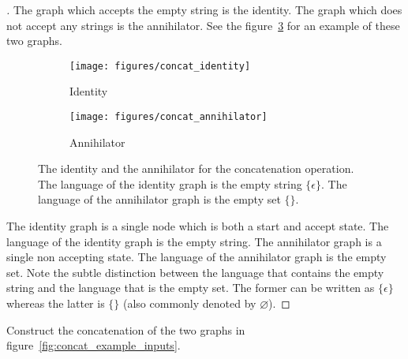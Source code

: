 \documentclass[main.tex]{subfiles}
\begin{document}
\begin{proof}[\unskip\nopunct]
The graph which accepts the empty string is the identity. The graph which does
not accept any strings is the annihilator. See the
figure~\ref{fig:concat_identity_annihilator} for an example of these two
graphs.

\begin{figure}
    \centering
    \begin{subfigure}[b]{0.48\textwidth}
        \centering
        \texttt{[image: figures/concat\_identity]}
        \caption{Identity}
        \label{fig:concat_identity}
    \end{subfigure}
    \begin{subfigure}[b]{0.48\textwidth}
        \centering
        \texttt{[image: figures/concat\_annihilator]}
        \caption{Annihilator}
        \label{fig:concat_annihilator}
    \end{subfigure}
    \caption{The identity and the annihilator for the concatenation operation.
    The language of the identity graph is the empty string $\{\epsilon\}$. The
    language of the annihilator graph is the empty set $\{\}$.}
    \label{fig:concat_identity_annihilator}
\end{figure}

The identity graph is a single node which is both a start and accept state. The
language of the identity graph is the empty string. The annihilator graph is a
single non accepting state. The language of the annihilator graph is the empty
set. Note the subtle distinction between the language that contains the empty
string and the language that is the empty set. The former can be written as
$\{\epsilon\}$ whereas the latter is $\{\}$ (also commonly denoted by
$\varnothing$).
\end{proof}

\begin{example}
Construct the concatenation of the two graphs in
figure~\ref{fig:concat_example_inputs}.
\end{example}
\end{document}
